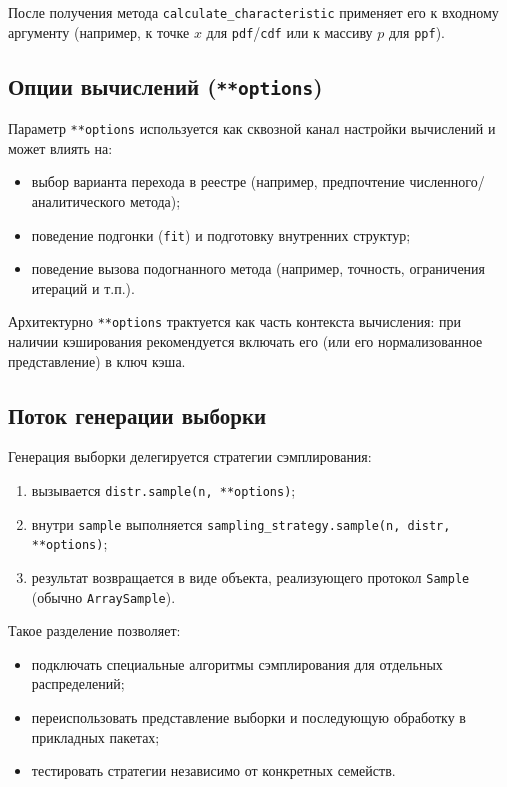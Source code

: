 После получения метода \texttt{calculate\_characteristic} применяет его к входному аргументу (например, к точке $x$ для \texttt{pdf}/\texttt{cdf} или к массиву $p$ для \texttt{ppf}).

\subsection{Опции вычислений (\texorpdfstring{\texttt{**options}}{**options})}

Параметр \texttt{**options} используется как сквозной канал настройки вычислений и может влиять на:
\begin{itemize}[compact]
      \item выбор варианта перехода в реестре (например, предпочтение численного/аналитического метода);
      \item поведение подгонки (\texttt{fit}) и подготовку внутренних структур;
      \item поведение вызова подогнанного метода (например, точность, ограничения итераций и т.п.).
\end{itemize}

Архитектурно \texttt{**options} трактуется как часть контекста вычисления: при наличии кэширования рекомендуется включать его (или его нормализованное представление) в ключ кэша.

\subsection{Поток генерации выборки}

Генерация выборки делегируется стратегии сэмплирования:\begin{enumerate}[compact]
      \item вызывается \texttt{distr.sample(n, **options)};
      \item внутри \texttt{sample} выполняется \texttt{sampling\_strategy.sample(n, distr, **options)};
      \item результат возвращается в виде объекта, реализующего протокол \texttt{Sample} (обычно \texttt{ArraySample}).
\end{enumerate}

Такое разделение позволяет:
\begin{itemize}[compact]
      \item подключать специальные алгоритмы сэмплирования для отдельных распределений;
      \item переиспользовать представление выборки и последующую обработку в прикладных пакетах;
      \item тестировать стратегии независимо от конкретных семейств.
\end{itemize}


